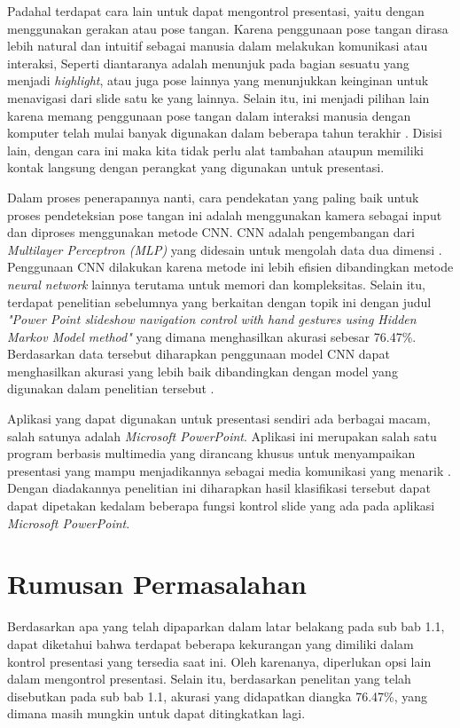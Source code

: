 Padahal terdapat cara lain untuk dapat mengontrol presentasi, yaitu dengan menggunakan gerakan atau pose tangan. Karena penggunaan pose tangan dirasa lebih natural dan intuitif sebagai manusia dalam melakukan komunikasi atau interaksi, Seperti diantaranya adalah menunjuk pada bagian sesuatu yang menjadi \emph{highlight}, atau juga pose lainnya yang menunjukkan keinginan untuk menavigasi dari slide satu ke yang lainnya. Selain itu, ini menjadi pilihan lain karena memang penggunaan pose tangan dalam interaksi manusia dengan komputer telah mulai banyak digunakan dalam beberapa tahun terakhir \parencite{Indriani2021}. Disisi lain, dengan cara ini maka kita tidak perlu alat tambahan ataupun memiliki kontak langsung dengan perangkat yang digunakan untuk presentasi.\parencite{FariaSoroni2021}

Dalam proses penerapannya nanti, cara pendekatan yang paling baik untuk proses pendeteksian pose tangan ini adalah menggunakan kamera sebagai input dan diproses menggunakan metode CNN. CNN adalah pengembangan dari \emph{Multilayer Perceptron (MLP)} yang didesain untuk mengolah data dua dimensi \parencite{IWayan2016}. Penggunaan CNN dilakukan karena metode ini lebih efisien dibandingkan metode \emph{neural network} lainnya terutama untuk memori dan kompleksitas. Selain itu, terdapat penelitian sebelumnya yang berkaitan dengan topik ini dengan judul \emph{"Power Point slideshow navigation control with hand gestures using Hidden Markov Model method"} yang dimana menghasilkan akurasi sebesar 76.47\%. Berdasarkan data tersebut diharapkan penggunaan model CNN dapat menghasilkan akurasi yang lebih baik dibandingkan dengan model yang digunakan dalam penelitian tersebut \parencite{AhmedKadem2020}.

Aplikasi yang dapat digunakan untuk presentasi sendiri ada berbagai macam, salah satunya adalah \emph{Microsoft PowerPoint}. Aplikasi ini merupakan salah satu program berbasis multimedia yang dirancang khusus untuk menyampaikan presentasi yang mampu menjadikannya sebagai media komunikasi yang menarik \parencite{Muthoharoh2019}. Dengan diadakannya penelitian ini diharapkan hasil klasifikasi tersebut dapat dapat dipetakan kedalam beberapa fungsi kontrol slide yang ada pada aplikasi \emph{Microsoft PowerPoint}.

\section{Rumusan Permasalahan}
\label{sec:permasalahan}

Berdasarkan apa yang telah dipaparkan dalam latar belakang pada sub bab 1.1, dapat diketahui bahwa terdapat beberapa kekurangan yang dimiliki dalam kontrol presentasi yang tersedia saat ini. Oleh karenanya, diperlukan opsi lain dalam mengontrol presentasi. Selain itu, berdasarkan penelitan yang telah disebutkan pada sub bab 1.1, akurasi yang didapatkan diangka 76.47\%, yang dimana masih mungkin untuk dapat ditingkatkan lagi.

